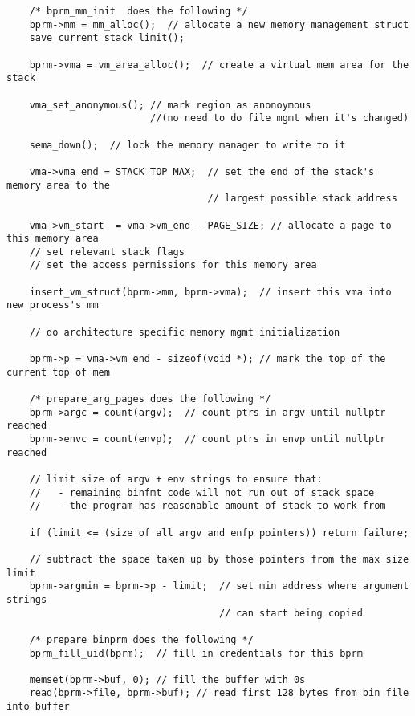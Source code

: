 \documentclass[a4paper]{article}
\begin{document}
{\begin{verbatim}
    /* bprm_mm_init  does the following */
    bprm->mm = mm_alloc();  // allocate a new memory management struct
    save_current_stack_limit();
    
    bprm->vma = vm_area_alloc();  // create a virtual mem area for the stack
    
    vma_set_anonymous(); // mark region as anonoymous 
                         //(no need to do file mgmt when it's changed)
                    
    sema_down();  // lock the memory manager to write to it
    
    vma->vma_end = STACK_TOP_MAX;  // set the end of the stack's memory area to the 
                                   // largest possible stack address
    
    vma->vm_start  = vma->vm_end - PAGE_SIZE; // allocate a page to this memory area
    // set relevant stack flags
    // set the access permissions for this memory area
    
    insert_vm_struct(bprm->mm, bprm->vma);  // insert this vma into new process's mm
    
    // do architecture specific memory mgmt initialization
    
    bprm->p = vma->vm_end - sizeof(void *); // mark the top of the current top of mem
    
    /* prepare_arg_pages does the following */
    bprm->argc = count(argv);  // count ptrs in argv until nullptr reached
    bprm->envc = count(envp);  // count ptrs in envp until nullptr reached
    
    // limit size of argv + env strings to ensure that:
    //   - remaining binfmt code will not run out of stack space
    //   - the program has reasonable amount of stack to work from
    
    if (limit <= (size of all argv and enfp pointers)) return failure;
    
    // subtract the space taken up by those pointers from the max size limit
    bprm->argmin = bprm->p - limit;  // set min address where argument strings 
                                     // can start being copied       
                                     
    /* prepare_binprm does the following */
    bprm_fill_uid(bprm);  // fill in credentials for this bprm
    
    memset(bprm->buf, 0); // fill the buffer with 0s 
    read(bprm->file, bprm->buf); // read first 128 bytes from bin file into buffer
    

\end{verbatim}}
\end{document}
